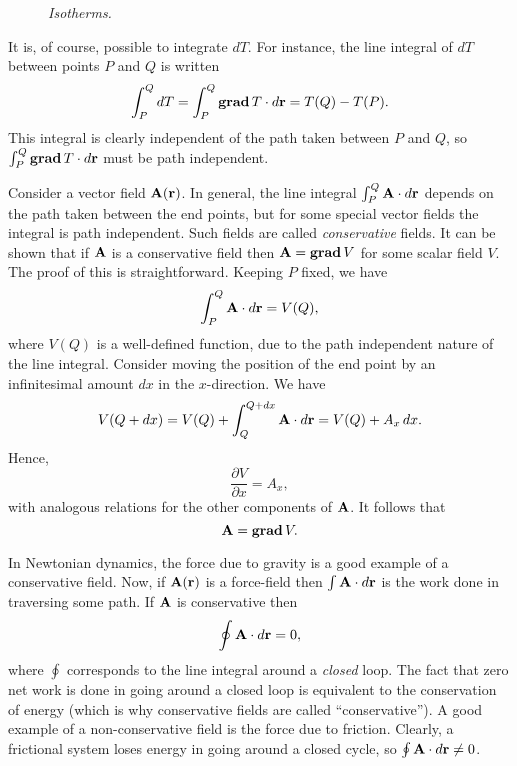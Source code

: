 \begin{figure}
\centerline{}
\caption{\em Isotherms.}\label{f16}
\end{figure}

It is, of course, possible to integrate $dT$. For instance, the line integral of $dT$ between points $P$ and
$Q$ is written
\begin{equation}
\int_P^Q dT = \int_P^Q {\bf grad}\,T\cdot d{\bf r} = T(Q)-T(P).
\end{equation}
This integral is clearly independent of the path taken between $P$ and $Q$, so
$\int_P^Q {\bf grad }\,T\cdot d{\bf r}$ must be path independent. 


Consider a vector field ${\bf A}({\bf r})$. In general, the line integral $\int_P^Q {\bf A}\cdot d{\bf r}$ depends on the path
taken between the end points,
but for some special vector fields the integral is path independent. Such fields
are called {\em conservative}\/ fields. It can be shown that if ${\bf A}$ is a
conservative field then ${\bf A} = {\bf grad}\,V$ for some scalar field $V$.
The proof of this is straightforward. Keeping $P$ fixed, we have
\begin{equation}
\int_P^Q {\bf A}\cdot d{\bf r} = V(Q),
\end{equation}
where $V(Q)$ is a well-defined function, due to the path independent nature of the
line integral. Consider moving the position of the end point by an infinitesimal
amount $dx$ in the $x$-direction. We have
\begin{equation}
V(Q+dx) = V(Q) + \int_Q^{Q+dx} {\bf A}\cdot d{\bf r} = V(Q) + A_x\,dx.
\end{equation}
Hence,
\begin{equation}
\frac{\partial V}{\partial x} = A_x,
\end{equation}
with analogous relations for the other components of ${\bf A}$. It follows that
\begin{equation}
{\bf A} = {\bf grad} \,V.
\end{equation}

In Newtonian dynamics, the force due to gravity is a good example of a conservative field.
Now, if ${\bf A}({\bf r})$ is a force-field then  $\int {\bf A}\cdot d{\bf r}$ is the work done
in traversing some path. If ${\bf A}$ is conservative then
\begin{equation}
\oint {\bf A}\cdot d{\bf r} = 0,
\end{equation}
where $\oint$ corresponds to the line integral around a {\em closed}\/ loop. 
The fact that zero net work is done in going around a closed loop is equivalent
to the conservation of energy (which is why conservative fields are called
``conservative''). A good example of a non-conservative field is the force due
to friction. Clearly, a frictional system loses energy in going around a closed
cycle, so $\oint {\bf A}\cdot d{\bf r} \neq 0$. 

